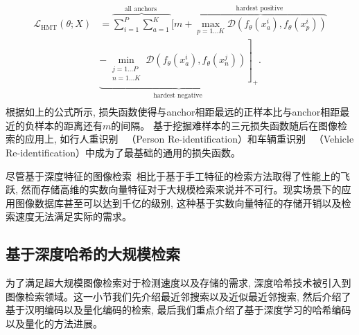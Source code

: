 \begin{equation}
    \begin{aligned}
         \mathcal{L}_{\mathrm{HMT}}(\theta ; X) &=\overbrace{\sum_{i=1}^P \sum_{a=1}^K}^{\text {all anchors }}[m+\overbrace{\max _{p=1 \ldots K} \mathcal{D}\left(f_\theta\left(x_a^i\right), f_\theta\left(x_p^i\right)\right)}^{\text {hardest positive }} \\
        & \underbrace{\left.-\min _{\substack{j=1 \ldots P \\
        n=1 \ldots K}} \mathcal{D}\left(f_\theta\left(x_a^i\right), f_\theta\left(x_n^j\right)\right)\right]_{+}}_{\text {hardest negative }}. \\
        \end{aligned}
        \label{eq:hardtri}
\end{equation}
根据如上的公式所示, 损失函数使得与anchor相距最远的正样本比与anchor相距最近的负样本的距离还有$m$的间隔。 基于挖掘难样本的三元损失函数随后在图像检索的应用上, 如行人重识别~\cite{fu2018one,luohaoreid, wang2018learning, sun2018beyond,rahimpour2017person,xu2018attention, fang2019bilinear} （Person Re-identification）和车辆重识别~\cite{chu2019vehicle, meng2020fine, meng2020parsing, liu2020beyond} （Vehicle Re-identification）中成为了最基础的通用的损失函数。\par
尽管基于深度特征的图像检索~\cite{wmz2021,zhq2017, zhanghao2018,mdm2014, rxl2018, cshuang2019, zhouye2017}相比于基于手工特征的检索方法取得了性能上的飞跃, 然而存储高维的实数向量特征对于大规模检索来说并不可行。现实场景下的应用图像数据库甚至可以达到千亿的级别, 这种基于实数向量特征的存储开销以及检索速度无法满足实际的需求。
\subsection{基于深度哈希的大规模检索}
为了满足超大规模图像检索对于检测速度以及存储的需求, 深度哈希技术被引入到图像检索领域。这一小节我们先介绍最近邻搜索以及近似最近邻搜索, 然后介绍了基于汉明编码以及量化编码的检索, 最后我们重点介绍了基于深度学习的哈希编码以及量化的方法进展。
